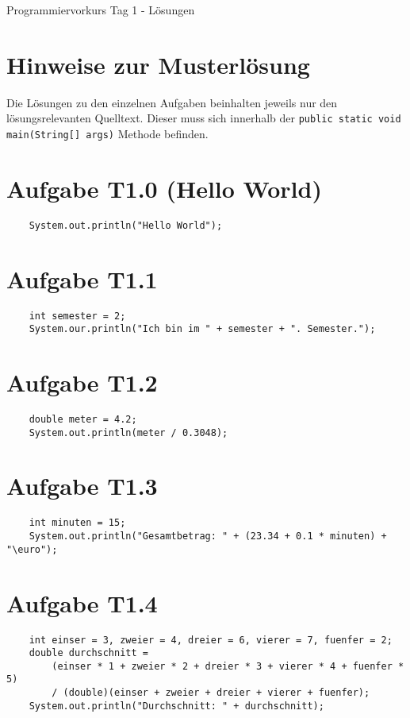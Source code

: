 \documentclass[final,a4paper]{article}
\begin{document}


{\huge Programmiervorkurs Tag 1 - Lösungen}

\bigskip

\section*{Hinweise zur Musterlösung}
Die Lösungen zu den einzelnen Aufgaben beinhalten jeweils nur den lösungsrelevanten Quelltext. Dieser muss sich innerhalb der \texttt{public static void main(String[] args)} Methode befinden.
\section*{Aufgabe T1.0 (Hello World)}
\begin{lstlisting}
	System.out.println("Hello World");
\end{lstlisting}
\section*{Aufgabe T1.1}
\begin{lstlisting}
	int semester = 2;
	System.our.println("Ich bin im " + semester + ". Semester.");
\end{lstlisting}
\section*{Aufgabe T1.2}
\begin{lstlisting}
	double meter = 4.2;
	System.out.println(meter / 0.3048);
\end{lstlisting}
\section*{Aufgabe T1.3}
\begin{lstlisting}
	int minuten = 15;
	System.out.println("Gesamtbetrag: " + (23.34 + 0.1 * minuten) + "\euro");
\end{lstlisting}
\section*{Aufgabe T1.4}
\begin{lstlisting}
	int einser = 3, zweier = 4, dreier = 6, vierer = 7, fuenfer = 2;
	double durchschnitt =
		(einser * 1 + zweier * 2 + dreier * 3 + vierer * 4 + fuenfer * 5)
		/ (double)(einser + zweier + dreier + vierer + fuenfer);
	System.out.println("Durchschnitt: " + durchschnitt);
\end{lstlisting}
\end{document}
